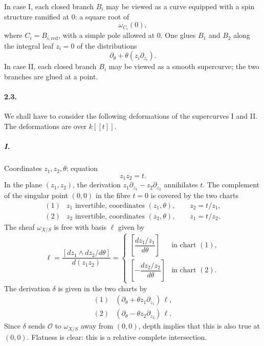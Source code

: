 \documentclass[11pt]{article}
\newcommand{\cO}{\mathcal O}
\begin{document}
In case I, each closed branch $B_i$ may be viewed as a curve equipped with a spin structure ramified at $0$: a square root of
\[
  \omega_{C_i}(0),
\]
where $C_i=B_{i,\mathrm{red}}$, with a simple pole allowed at $0$. One glues $B_1$ and $B_2$ along the integral leaf $z_i=0$ of the distributions
\[
  \partial_\theta+\theta(z_i\partial_{z_i}).
\]
In case II, each closed branch $B_i$ may be viewed as a smooth supercurve; the two branches are glued at a point.

\paragraph{2.3.}
We shall have to consider the following deformations of the supercurves I and II. The deformations are over $k[[t]]$.

\subparagraph{I.}
Coordinates $z_1,z_2,\theta$; equation
\[
  z_1z_2=t.
\]
In the plane $(z_1,z_2)$, the derivation $z_1\partial_{z_1}-z_2\partial_{z_2}$ annihilates $t$. The complement of the singular point $(0,0)$ in the fibre $t=0$ is covered by the two charts
\[
\begin{array}{ll}
(1)& z_1\text{ invertible, coordinates }(z_1,\theta),\qquad z_2=t/z_1,\\
(2)& z_2\text{ invertible, coordinates }(z_2,\theta),\qquad z_1=t/z_2.
\end{array}
\]
The sheaf $\omega_{X/S}$ is free with basis $\ell$ given by
\[
  \ell=\frac{[dz_1\wedge dz_2/d\theta]}{d(z_1z_2)}
  =\begin{cases}
  \left[\dfrac{dz_1/z_1}{d\theta}\right]&\text{in chart }(1),\\[1.2ex]
  \left[-\dfrac{dz_2/z_2}{d\theta}\right]&\text{in chart }(2).
  \end{cases}
\]
The derivation $\delta$ is given in the two charts by
\[
\begin{array}{ll}
(1)&(\partial_\theta+\theta z_1\partial_{z_1})\,\ell,\\
(2)&(\partial_\theta-\theta z_2\partial_{z_2})\,\ell.
\end{array}
\]
Since $\delta$ sends $\cO$ to $\omega_{X/S}$ away from $(0,0)$, depth implies that this is also true at $(0,0)$. Flatness is clear: this is a relative complete intersection.
\end{document}

